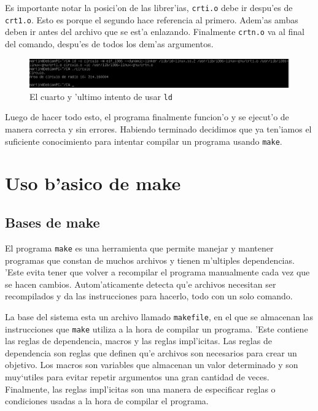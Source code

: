 \documentclass[11pt]{article}
\begin{document}
		Es importante notar la posici'on de las librer'ias, \texttt{crti.o} debe ir despu'es de \texttt{crt1.o}. Esto es porque el segundo hace referencia al primero. Adem'as ambas deben ir antes del archivo que se est'a enlazando. Finalmente \texttt{crtn.o} va al final del comando, despu'es de todos los dem'as argumentos.
		
		\begin{figure}[H]
			\centering
			\includegraphics[width=.9\linewidth]{Images/Seccion 1/S1 parte nueve.PNG}
			\caption{El cuarto y 'ultimo intento de usar \texttt{ld}}
			\label{fig:fourth-ld-attempt}
		\end{figure}
		
		Luego de hacer todo esto, el programa finalmente funcion'o y se ejecut'o de manera correcta y sin errores. Habiendo terminado decidimos que ya ten'iamos el suficiente conocimiento para intentar compilar un programa usando \texttt{make}.
		
		
	\section{Uso b'asico de make}
	\subsection{Bases de make}
		El programa \texttt{make} es una herramienta que permite manejar y mantener programas que constan de muchos archivos y tienen m'ultiples dependencias. 'Este evita tener que volver a recompilar el programa manualmente cada vez que se hacen cambios. Autom'aticamente detecta qu'e archivos necesitan ser recompilados y da las instrucciones para hacerlo, todo con un solo comando.
		
		La base del sistema esta un archivo llamado \texttt{makefile}, en el que se almacenan las instrucciones que \texttt{make} utiliza a la hora de compilar un programa. 'Este contiene las reglas de dependencia, macros y las reglas impl'icitas. Las reglas de dependencia son reglas que definen qu'e archivos son necesarios para crear un objetivo\footnotemark. Los macros son variables que almacenan un valor determinado y son muy`utiles para evitar repetir argumentos una gran cantidad de veces. Finalmente, las reglas impl'icitas son una manera de especificar reglas o condiciones usadas a la hora de compilar el programa.
		
\end{document}
